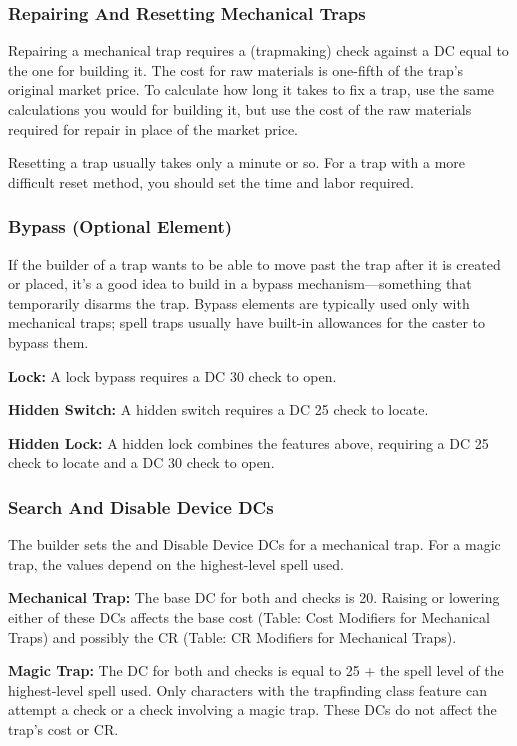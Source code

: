 \subsubsection{Repairing And Resetting Mechanical Traps}
Repairing a mechanical trap requires a  (trapmaking) check against a DC equal to the one for building it. The cost for raw materials is one-fifth of the trap's original market price. To calculate how long it takes to fix a trap, use the same calculations you would for building it, but use the cost of the raw materials required for repair in place of the market price.

Resetting a trap usually takes only a minute or so. For a trap with a more difficult reset method, you should set the time and labor required.

\subsubsection{Bypass (Optional Element)}
If the builder of a trap wants to be able to move past the trap after it is created or placed, it's a good idea to build in a bypass mechanism---something that temporarily disarms the trap. Bypass elements are typically used only with mechanical traps; spell traps usually have built-in allowances for the caster to bypass them.

\textbf{Lock:} A lock bypass requires a DC 30  check to open.

\textbf{Hidden Switch:} A hidden switch requires a DC 25  check to locate.

\textbf{Hidden Lock:} A hidden lock combines the features above, requiring a DC 25  check to locate and a DC 30  check to open.

\subsubsection{Search And Disable Device DCs}
The builder sets the  and Disable Device DCs for a mechanical trap. For a magic trap, the values depend on the highest-level spell used.

\textbf{Mechanical Trap:} The base DC for both  and  checks is 20. Raising or lowering either of these DCs affects the base cost (Table: Cost Modifiers for Mechanical Traps) and possibly the CR (Table: CR Modifiers for Mechanical Traps).

\textbf{Magic Trap:} The DC for both  and  checks is equal to 25 + the spell level of the highest-level spell used. Only characters with the trapfinding class feature can attempt a  check or a  check involving a magic trap. These DCs do not affect the trap's cost or CR.

